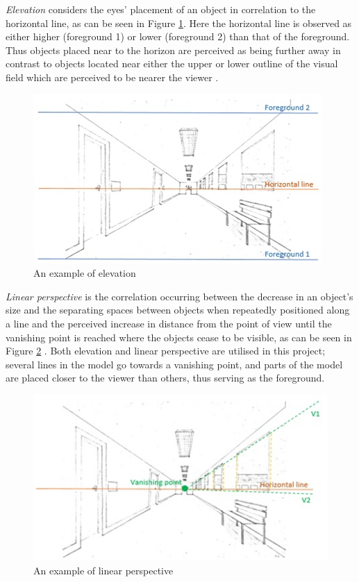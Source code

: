 \pagebreak
\textit{Elevation} considers the eyes' placement of an object in correlation to the horizontal line, as can be seen in Figure \ref{fig:cue3}. Here the horizontal line is observed as either higher (foreground 1) or lower  (foreground 2) than that of the foreground. Thus objects placed near to the horizon are perceived as being further away in contrast to objects located near either the upper or lower outline of the visual field which are perceived to be nearer the viewer \cite{Gale}.

\begin{figure}[h!]
   \centering
   \includegraphics[scale=0.85]{figures/cue3.jpg}
   \caption{An example of elevation}\label{fig:cue3}
\end{figure}

\textit{Linear perspective} is the correlation occurring between the decrease in an object’s size and the separating spaces between objects when repeatedly positioned along a line and the perceived increase in distance from the point of view until the vanishing point is reached where the objects cease to be visible, as can be seen in Figure \ref{fig:cue4} \cite{Gale}. Both elevation and linear perspective are utilised in this project; several lines in the model go towards a vanishing point, and parts of the model are placed closer to the viewer than others, thus serving as the foreground.

\begin{figure}[h!]
   \centering
   \includegraphics[scale=0.85]{figures/cue4.jpg}
   \caption{An example of linear perspective}\label{fig:cue4}
\end{figure}

